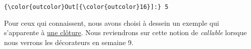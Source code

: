 \begin{Verbatim}[commandchars=\\\{\}]
{\color{outcolor}Out[{\color{outcolor}16}]:} 5
\end{Verbatim}
            
    Pour ceux qui connaissent, nous avons choisi à dessein un exemple qui
s'apparente à
\href{http://en.wikipedia.org/wiki/Closure_\%28computer_programming\%29}{une
clôture}. Nous reviendrons sur cette notion de \emph{callable} lorsque
nous verrons les décorateurs en semaine 9.